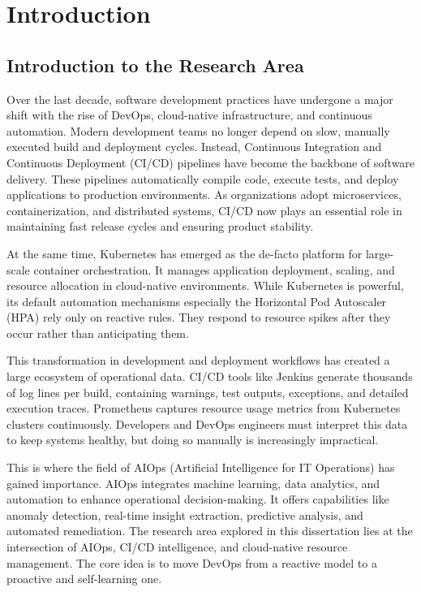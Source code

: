 \documentclass[12pt]{report}
\begin{document}
\clearpage
{}
\setcounter{page}{1}
\chapter{Introduction}

\section{Introduction to the Research Area}

Over the last decade, software development practices have undergone a major shift with the rise of DevOps, cloud-native infrastructure, and continuous automation. Modern development teams no longer depend on slow, manually executed build and deployment cycles. Instead, Continuous Integration and Continuous Deployment (CI/CD) pipelines have become the backbone of software delivery. These pipelines automatically compile code, execute tests, and deploy applications to production environments. As organizations adopt microservices, containerization, and distributed systems, CI/CD now plays an essential role in maintaining fast release cycles and ensuring product stability.

At the same time, Kubernetes has emerged as the de-facto platform for large-scale container orchestration. It manages application deployment, scaling, and resource allocation in cloud-native environments. While Kubernetes is powerful, its default automation mechanisms especially the Horizontal Pod Autoscaler (HPA) rely only on reactive rules. They respond to resource spikes after they occur rather than anticipating them.

This transformation in development and deployment workflows has created a large ecosystem of operational data. CI/CD tools like Jenkins generate thousands of log lines per build, containing warnings, test outputs, exceptions, and detailed execution traces. Prometheus captures resource usage metrics from Kubernetes clusters continuously. Developers and DevOps engineers must interpret this data to keep systems healthy, but doing so manually is increasingly impractical.

This is where the field of AIOps (Artificial Intelligence for IT Operations) has gained importance. AIOps integrates machine learning, data analytics, and automation to enhance operational decision-making. It offers capabilities like anomaly detection, real-time insight extraction, predictive analysis, and automated remediation. The research area explored in this dissertation lies at the intersection of AIOps, CI/CD intelligence, and cloud-native resource management. The core idea is to move DevOps from a reactive model to a proactive and self-learning one.
\end{document}
